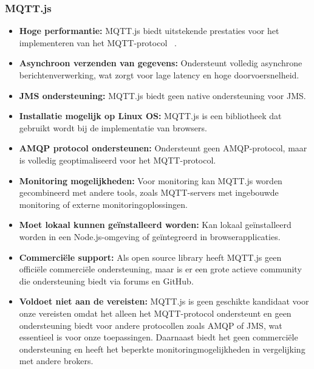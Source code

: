 \subsubsection{MQTT.js}
\begin{itemize}
    \item \textbf{Hoge performantie:} MQTT.js biedt uitstekende prestaties voor het implementeren van het MQTT-protocol ~\autocite{Yu2024}.
    \item \textbf{Asynchroon verzenden van gegevens:} Ondersteunt volledig asynchrone berichtenverwerking, wat zorgt voor lage latency en hoge doorvoersnelheid.
    \item \textbf{JMS ondersteuning:} MQTT.js biedt geen native ondersteuning voor JMS.
    \item \textbf{Installatie mogelijk op Linux OS:} MQTT.js is een bibliotheek dat gebruikt wordt bij de implementatie van browsers.
    \item \textbf{AMQP protocol ondersteunen:} Ondersteunt geen AMQP-protocol, maar is volledig geoptimaliseerd voor het MQTT-protocol.
    \item \textbf{Monitoring mogelijkheden:} Voor monitoring kan MQTT.js worden gecombineerd met andere tools, zoals MQTT-servers met ingebouwde monitoring of externe monitoringoplossingen.
    \item \textbf{Moet lokaal kunnen geïnstalleerd worden:} Kan lokaal geïnstalleerd worden in een Node.js-omgeving of geïntegreerd in browserapplicaties.
    \item \textbf{Commerciële support:} Als open source library heeft MQTT.js geen officiële commerciële ondersteuning, maar is er een grote actieve community die ondersteuning biedt via forums en GitHub.
    \item \textbf{Voldoet niet aan de vereisten:}  
    MQTT.js is geen geschikte kandidaat voor onze vereisten omdat het alleen het MQTT-protocol ondersteunt en geen ondersteuning biedt voor andere protocollen zoals AMQP of JMS, wat essentieel is voor onze toepassingen. 
    Daarnaast biedt het geen commerciële ondersteuning en heeft het beperkte monitoringmogelijkheden in vergelijking met andere brokers. 
\end{itemize}
 

